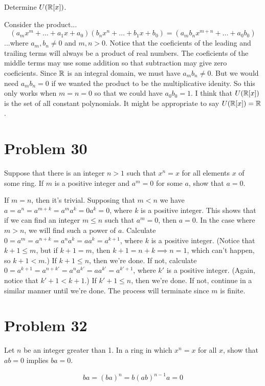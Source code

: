 \documentclass{article}
\begin{document}
Determine $U(\mathbb{R}[x])$.

Consider the product...
\begin{equation*}
(a_m x^m + \dots + a_1 x + a_0)(b_n x^n + \dots + b_1 x + b_0) = (a_mb_nx^{m+n} + \dots + a_0b_0)
\end{equation*}
...where $a_m,b_n\neq 0$ and $m,n>0$.
Notice that the coeficients of the leading and trailing terms will always be a product of
real numbers.  The coeficients of the middle terms may use some addition so that subtraction
may give zero coeficients.
Since $\mathbb{R}$ is an integral domain, we must have $a_mb_n\neq 0$.  But we would need $a_mb_n=0$
if we wanted the product to be the multiplicative idenity.
So this only works when $m=n=0$ so that we could have $a_0b_0=1$.
I think that $U(\mathbb{R}[x])$ is the set of all constant polynomials.
It might be appropriate to say $U(\mathbb{R}[x])=\mathbb{R}$.

\section*{Problem 30}

Suppose that there is an integer $n>1$ such that $x^n=x$ for all elements
$x$ of some ring.  If $m$ is a positive integer and $a^m=0$ for some $a$,
show that $a=0$.

If $m=n$, then it's trivial.
Supposing that $m<n$ we have $a=a^n=a^{m+k}=a^ma^k=0a^k=0$, where $k$ is a positive integer.
This shows that if we can find an integer $m\leq n$ such that $a^m=0$, then $a=0$.
In the case where $m>n$, we will find such a power of $a$.
Calculate $0=a^m=a^{n+k}=a^na^k=aa^k=a^{k+1}$, where $k$ is a positive integer.
(Notice that $k+1\leq m$, but if $k+1=m$, then $k+1=n+k\implies n=1$, which can't happen,
so $k+1<m$.)
If $k+1\leq n$, then we're done.
If not, calculate $0=a^{k+1}=a^{n+k'}=a^na^{k'}=aa^{k'}=a^{k'+1}$, where $k'$ is a positive integer.
(Again, notice that $k'+1<k+1$.)
If $k'+1\leq n$, then we're done.  If not, continue in a similar manner until we're done.
The process will terminate since $m$ is finite.

\section*{Problem 32}

Let $n$ be an integer greater than 1.  In a ring in which $x^n=x$ for all $x$,
show that $ab=0$ implies $ba=0$.

\begin{equation*}
ba = (ba)^n = b(ab)^{n-1}a = 0
\end{equation*}
\end{document}

